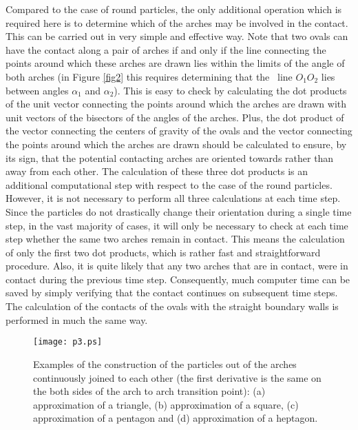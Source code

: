 \documentclass[granma]{svjour}
\begin{document}
Compared to the case of round particles, the only additional operation which
is required here is to determine which of the arches may be involved in the
contact. This can be carried out in very simple and effective way. Note that
two ovals can have the contact along a pair of arches if and only if the line
connecting the points around which these arches are drawn lies within the
limits of the angle of both arches (in Figure \ref{fig2} this requires
determining
that the \ line $O_1O_2$ lies between angles $\alpha_1$ and $\alpha_2$). This
is easy to check by calculating the dot products of the unit vector
connecting the points around which the arches are drawn with unit vectors of
the bisectors of the angles of the arches. Plus, the dot product of the
vector connecting the centers of gravity of the ovals and the vector
connecting the points around which the arches are drawn should be calculated
to ensure, by its sign, that the potential contacting arches are oriented
towards rather than away from each other. The calculation of these three dot
products is an additional computational step with respect to the case of the
round particles. However, it is not necessary to perform all three
calculations at each time step. Since the particles do not drastically change
their orientation during a single time step, in the vast majority of cases,
it will only be necessary to check at each time step whether the same two
arches remain in contact. This means the calculation of only the first two
dot products, which is rather fast and straightforward procedure. Also, it is
quite likely that any two arches that are in contact, were in contact during
the previous time step. Consequently, much computer time can be saved by
simply verifying that the contact continues on subsequent time steps. The
calculation of the contacts of the ovals with the straight boundary walls is
performed in much the same way.  \enlargethispage{3pt}

\begin{figure}
\texttt{[image: p3.ps]}
\caption{Examples of the construction of the particles out of the
arches continuously joined to each other (the first derivative is the
same on the both sides of the arch to arch transition point): (a)
approximation of a triangle, (b) approximation of a square, (c)
approximation of a pentagon and (d) approximation of a heptagon.}\label{fig3}
\end{figure}
\end{document}
